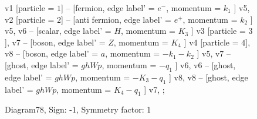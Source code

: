 \documentclass{revtex4}
\begin{document}
\begin{figure}[!htb]
\begin{center}
{    %
v1 [particle = \(1\)] -- [fermion, edge label' = \(e^{-}\), momentum = \(k_{1}\) ] v5, 
v2 [particle = \(2\)] -- [anti fermion, edge label' = \(e^{+}\), momentum = \(k_{2}\) ] v5, 
v6 -- [scalar, edge label' = \(H\), momentum = \(K_{3}\) ] v3 [particle = \(3\)], 
v7 -- [boson, edge label' = \(Z\), momentum = \(K_{4}\) ] v4 [particle = \(4\)], 
v8 -- [boson, edge label' = \(a\), momentum = \(-k_{1} - k_{2}\) ] v5, 
v7 -- [ghost, edge label' = \(ghWp\), momentum = \(-q_{1}\) ] v6, 
v6 -- [ghost, edge label' = \(ghWp\), momentum = \(-K_{3} - q_{1}\) ] v8, 
v8 -- [ghost, edge label' = \(ghWp\), momentum = \(K_{4} - q_{1}\) ] v7, 
};
\end{center}
\caption{Diagram78, Sign: -1, Symmetry factor: 1}
\end{figure}
\newpage
\end{document}
